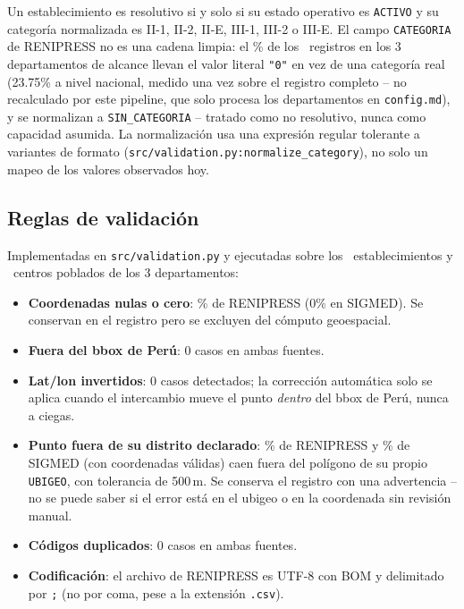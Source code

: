 \documentclass[11pt]{article}
\begin{document}
Un establecimiento es resolutivo si y solo si su estado operativo es
\texttt{ACTIVO} y su categoría normalizada es II-1, II-2, II-E, III-1,
III-2 o III-E. El campo \texttt{CATEGORIA} de RENIPRESS no es una cadena
limpia: el \statPctCategoryZero\% de los \statNFacilities\ registros en los 3
departamentos de alcance llevan el valor literal \texttt{"0"} en vez de una
categoría real (23.75\% a nivel nacional, medido una vez sobre el registro
completo -- no recalculado por este pipeline, que solo procesa los
departamentos en \texttt{config.md}), y se normalizan a
\texttt{SIN\_CATEGORIA} --
tratado como no resolutivo, nunca como capacidad asumida. La normalización
usa una expresión regular tolerante a variantes de formato
(\texttt{src/validation.py:normalize\_category}), no solo un mapeo de los
valores observados hoy.

\subsection{Reglas de validación}

Implementadas en \texttt{src/validation.py} y ejecutadas sobre los
\statNFacilities\ establecimientos y \statNCentrosPoblados\ centros
poblados de los 3 departamentos:

\begin{itemize}
  \item \textbf{Coordenadas nulas o cero}: \statPctMissingCoords\% de
  RENIPRESS (0\% en SIGMED). Se conservan en el registro pero se excluyen
  del cómputo geoespacial.
  \item \textbf{Fuera del bbox de Perú}: 0 casos en ambas fuentes.
  \item \textbf{Lat/lon invertidos}: 0 casos detectados; la corrección
  automática solo se aplica cuando el intercambio mueve el punto
  \emph{dentro} del bbox de Perú, nunca a ciegas.
  \item \textbf{Punto fuera de su distrito declarado}: \statPctContainmentRenipress\%
  de RENIPRESS y \statPctContainmentSigmed\% de SIGMED (con coordenadas
  válidas) caen fuera del polígono de
  su propio \texttt{UBIGEO}, con tolerancia de 500\,m. Se conserva el
  registro con una advertencia -- no se puede saber si el error está en el
  ubigeo o en la coordenada sin revisión manual.
  \item \textbf{Códigos duplicados}: 0 casos en ambas fuentes.
  \item \textbf{Codificación}: el archivo de RENIPRESS es UTF-8 con BOM y
  delimitado por \texttt{;} (no por coma, pese a la extensión \texttt{.csv}).
\end{itemize}
\end{document}
